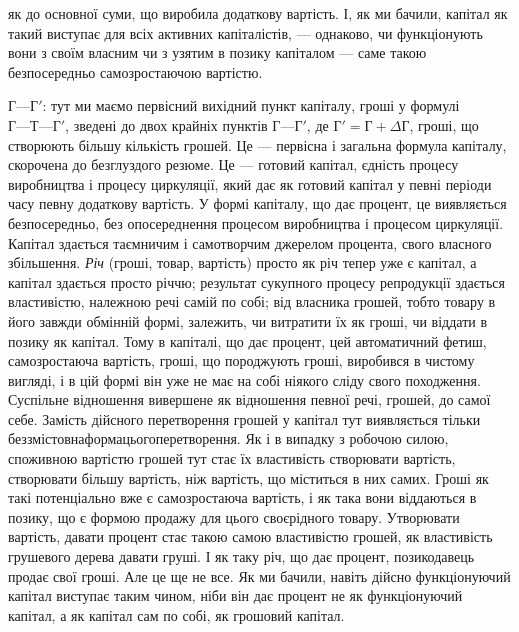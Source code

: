 \parcont{}  %
як до основної суми, що виробила додаткову вартість. І, як ми
бачили, капітал як такий виступає для всіх активних капіталістів,
— однаково, чи функціонують вони з своїм власним чи
з узятим в позику капіталом — саме такою безпосередньо самозростаючою
вартістю.

$Г — Г'$: тут ми маємо первісний вихідний пункт капіталу, гроші
у формулі $Г — Т — Г'$, зведені до двох крайніх пунктів $Г — Г'$, де
$Г' = Г + ΔГ$, гроші, що створюють більшу кількість грошей.
Це — первісна і загальна формула капіталу, скорочена до безглуздого
резюме. Це — готовий капітал, єдність процесу виробництва
і процесу циркуляції, який дає як готовий капітал у
певні періоди часу певну додаткову вартість. У формі капіталу,
що дає процент, це виявляється безпосередньо, без опосереднення
процесом виробництва і процесом циркуляції. Капітал
здається таємничим і самотворчим джерелом процента, свого
власного збільшення. \emph{Річ} (гроші, товар, вартість) просто як річ
тепер уже є капітал, а капітал здається просто річчю; результат
сукупного процесу репродукції здається властивістю, належною
речі самій по собі; від власника грошей, тобто товару
в його завжди обмінній формі, залежить, чи витратити їх як гроші,
чи віддати в позику як капітал. Тому в капіталі, що дає процент,
цей автоматичний фетиш, самозростаюча вартість, гроші,
що породжують гроші, виробився в чистому вигляді, і в цій
формі він уже не має на собі ніякого сліду свого походження.
Суспільне відношення вивершене як відношення певної речі, грошей,
до самої себе. Замість дійсного перетворення грошей у капітал
тут виявляється тільки беззмістовнаформацьогоперетворення.
Як і в випадку з робочою силою, споживною вартістю грошей
тут стає їх властивість створювати вартість, створювати більшу
вартість, ніж вартість, що міститься в них самих. Гроші як такі
потенціально вже є самозростаюча вартість, і як така вони віддаються
в позику, що є формою продажу для цього своєрідного
товару. Утворювати вартість, давати процент стає такою
самою властивістю грошей, як властивість грушевого дерева
давати груші. І як таку річ, що дає процент, позикодавець
продає свої гроші. Але це ще не все. Як ми бачили, навіть
дійсно функціонуючий капітал виступає таким чином, ніби він
дає процент не як функціонуючий капітал, а як капітал сам по
собі, як грошовий капітал.

